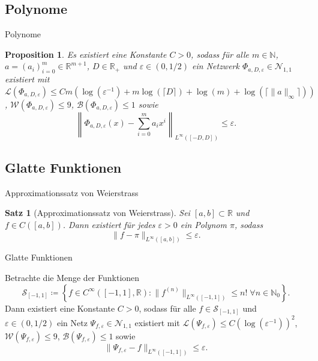 \documentclass[10pt,aspectratio=169]{beamer}
\theoremstyle{plain} %
\newtheorem{proposition}[theorem]{Proposition}
\newtheorem*{satz*}{Satz} %
\theoremstyle{remark} %
\newcommand{\N}{\mathbb{N}} %
\newcommand{\R}{\mathbb{R}} %
\newcommand{\norm}[1]{\|#1\|}
\begin{document}
\subsection{Polynome}

\begin{frame}{Polynome}
    \begin{proposition} %
        \newcommand{\Phia}{\Phi_{a,D,\varepsilon}}
        Es existiert eine Konstante \(C>0\), sodass für alle \(m\in \N\), \(a = (a_i)_{i=0}^m \in \R^{m+1}\), 
        \(D\in \R_+\) und \(\varepsilon \in (0,1/2)\) ein Netzwerk \(\Phia \in \mathcal{N}_{1,1}\) 
        existiert mit \(\mathcal{L}(\Phia) \leq C m (\log(\varepsilon^{-1}) + m\log(\lceil D \rceil) + \log(m) + \log(\lceil \norm{a}_\infty \rceil))\), 
        \(\mathcal{W}(\Phia) \leq 9\), \(\mathcal{B}(\Phia) \leq 1\) sowie 
        \[ \left\|\Phia(x) - \sum_{i=0}^m a_i x^i \right\|_{L^\infty([-D,D])} \leq \varepsilon. \]
    \end{proposition}
\end{frame}

\subsection{Glatte Funktionen}

\begin{frame}{Approximationssatz von Weierstrass}
    \begin{satz*}[Approximationssatz von Weierstrass] %
        Sei \([a,b] \subset \R\) und \(f\in C([a,b])\). Dann existiert für jedes \(\varepsilon > 0\) ein 
        Polynom \(\pi\), sodass 
        \[ \norm{f - \pi }_{L^\infty([a,b])} \leq \varepsilon. \]
    \end{satz*}
\end{frame}

\begin{frame}{Glatte Funktionen}
    \begin{lemma} %
        Betrachte die Menge der Funktionen 
        \[ \mathcal{S}_{[-1,1]} \coloneqq \left\{ f \in C^\infty([-1,1], \R): \norm{f^{(n)}}_{L^\infty([-1,1])} \leq n! \;\forall n \in \N_0 \right\}. \]
        Dann existiert eine Konstante \(C>0\), sodass für alle \(f\in \mathcal{S}_{[-1,1]}\) und \(\varepsilon\in (0,1/2)\) 
        ein Netz \(\Psi_{f,\varepsilon} \in \mathcal{N}_{1,1}\) existiert mit 
        \( \mathcal{L}(\Psi_{f,\varepsilon}) \leq C(\log(\varepsilon^{-1}))^2 \), 
        \(\mathcal{W}(\Psi_{f,\varepsilon}) \leq 9\), \(\mathcal{B}(\Psi_{f,\varepsilon}) \leq 1\) 
        sowie 
        \[ \norm{\Psi_{f,\varepsilon} - f}_{L^\infty([-1,1])} \leq \varepsilon. \]
    \end{lemma}
\end{frame}
\end{document}

